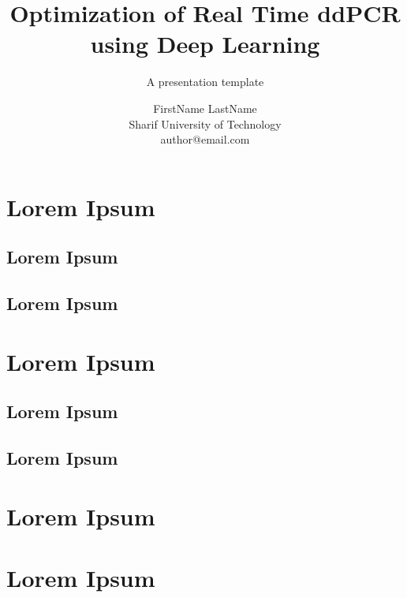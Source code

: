 \documentclass[UKenglish, aspectratio = 169]{beamer}
\author[Author Name]
{FirstName LastName\\Sharif University of Technology\\author@email.com}
\title{Optimization of Real Time ddPCR \\using Deep Learning}
\subtitle{A presentation template}
\begin{document}
     \begin{frame}[allowframebreaks]
    \tableofcontents
\end{frame}

\section{Lorem Ipsum}
	\subsection{Lorem Ipsum}
	\subsection{Lorem Ipsum}
\section{Lorem Ipsum}
	\subsection{Lorem Ipsum}
	\subsection{Lorem Ipsum}
\section{Lorem Ipsum}
\section{Lorem Ipsum}
	
\end{document}
